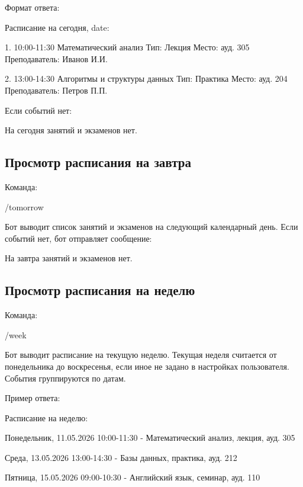 \documentclass[10pt,a4paper,final]{article} %
\begin{document}
Формат ответа:

\begin{Code}
Расписание на сегодня, {date}:

1. 10:00-11:30
Математический анализ
Тип: Лекция
Место: ауд. 305
Преподаватель: Иванов И.И.

2. 13:00-14:30
Алгоритмы и структуры данных
Тип: Практика
Место: ауд. 204
Преподаватель: Петров П.П.
\end{Code}

Если событий нет:

\begin{Code}
На сегодня занятий и экзаменов нет.
\end{Code}

\subsection{Просмотр расписания на завтра}

Команда:

\begin{Code}
/tomorrow
\end{Code}

Бот выводит список занятий и экзаменов на следующий календарный день. Если событий нет, бот отправляет сообщение:

\begin{Code}
На завтра занятий и экзаменов нет.
\end{Code}

\subsection{Просмотр расписания на неделю}

Команда:

\begin{Code}
/week
\end{Code}

Бот выводит расписание на текущую неделю. Текущая неделя считается от понедельника до воскресенья, если иное не задано в настройках пользователя. События группируются по датам.

Пример ответа:

\begin{Code}
Расписание на неделю:

Понедельник, 11.05.2026
10:00-11:30 - Математический анализ, лекция, ауд. 305

Среда, 13.05.2026
13:00-14:30 - Базы данных, практика, ауд. 212

Пятница, 15.05.2026
09:00-10:30 - Английский язык, семинар, ауд. 110
\end{Code}
\end{document}
